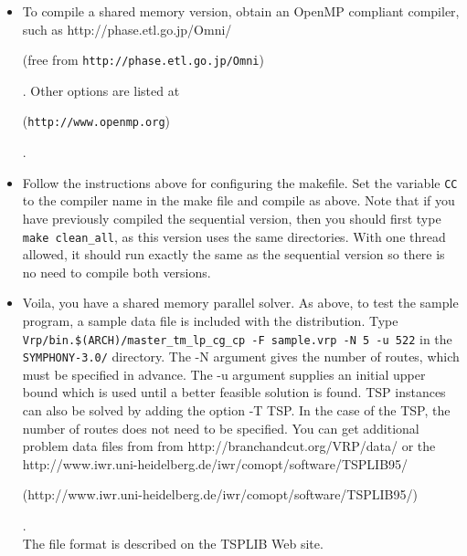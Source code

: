\begin{itemize}
        \item To compile a shared memory version, obtain an OpenMP
        compliant compiler, such as 
        {http://phase.etl.go.jp/Omni/}
\begin{latexonly} 
        (free from {\tt http://phase.etl.go.jp/Omni})
\end{latexonly}. 
        Other options are listed at 
\begin{latexonly}
        ({\tt http://www.openmp.org})
\end{latexonly}.

        \item Follow the instructions above for configuring the makefile. Set
the variable {\tt CC} to the compiler name in the make file and compile as
above. Note that if you have previously compiled the sequential version, then
you should first type {\tt make clean\_all}, as this version uses the same
directories.  With one thread allowed, it should run exactly the same as the
sequential version so there is no need to compile both versions.

        \item Voila, you have a shared memory parallel solver. As above, to
test the sample program, a sample data file is included with the
distribution. Type {\tt Vrp/bin.\$(ARCH)/master\_tm\_lp\_cg\_cp -F sample.vrp
-N 5 -u 522} in the {\tt SYMPHONY-3.0/} directory. The -N argument gives the number
of routes, which must be specified in advance. The -u argument supplies an
initial upper bound which is used until a better feasible solution is
found. TSP instances can also be solved by adding the option -T TSP. In the
case of the TSP, the number of routes does not need to be specified. You can
get additional problem data files from from  {http://branchandcut.org/VRP/data/} or the
\\ 
{http://www.iwr.uni-heidelberg.de/iwr/comopt/software/TSPLIB95/}
\begin{latexonly}
        (http://www.iwr.uni-heidelberg.de/iwr/comopt/software/TSPLIB95/)
\end{latexonly}. \\
The file format is described on the TSPLIB Web site.

\end{itemize}


